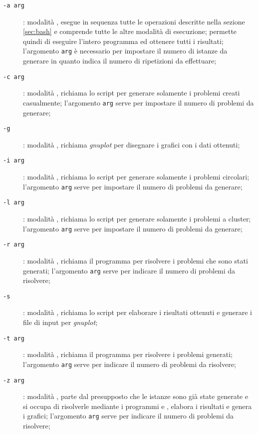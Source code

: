 \begin{description}
	\item[\texttt{-a arg}]: modalità , esegue in sequenza tutte le operazioni descritte nella sezione \ref{sec:bash} e comprende tutte le altre modalità di esecuzione; permette quindi di eseguire l'intero programma ed ottenere tutti i risultati; l'argomento \texttt{arg} è necessario per impostare il numero di istanze da generare in quanto indica il numero di ripetizioni da effettuare;
	\item[\texttt{-c arg}]: modalità , richiama lo script  per generare solamente i problemi creati casualmente; l'argomento \texttt{arg} serve per impostare il numero di problemi da generare;
	\item[\texttt{-g}]: modalità , richiama \emph{gnuplot} per disegnare i grafici con i dati ottenuti;
	\item[\texttt{-i arg}]: modalità , richiama lo script  per generare  solamente i problemi circolari; l'argomento \texttt{arg} serve per impostare il numero di problemi da generare;
	\item[\texttt{-l arg}]: modalità , richiama lo script  per generare  solamente i problemi a cluster; l'argomento \texttt{arg} serve per impostare il numero di problemi da generare;
	\item[\texttt{-r arg}]: modalità , richiama il programma  per risolvere i problemi che sono stati generati; l'argomento \texttt{arg} serve per indicare il numero di problemi da risolvere;
	\item[\texttt{-s}]: modalità , richiama lo script  per elaborare i risultati ottenuti e generare i file di input per \emph{gnuplot};
	\item[\texttt{-t arg}]: modalità , richiama il programma  per risolvere i problemi generati; l'argomento \texttt{arg} serve per indicare il numero di problemi da risolvere;
	\item[\texttt{-z arg}]: modalità , parte dal presupposto che le istanze sono già state generate e si occupa di risolverle mediante i programmi  e , elabora i risultati e genera i grafici; l'argomento \texttt{arg} serve per indicare il numero di problemi da risolvere;
\end{description}

